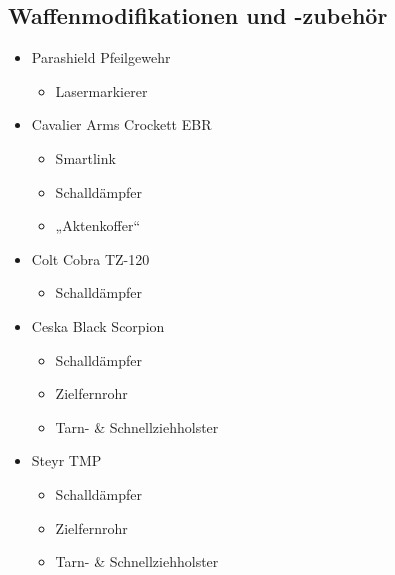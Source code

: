 {\begin{multicols}{2}
\section*{Waffenmodifikationen und -zubehör}
\begin{itemize}
	\item Parashield Pfeilgewehr
		\begin{itemize}
			\item  Lasermarkierer
		\end{itemize}
	\item Cavalier Arms Crockett EBR
		\begin{itemize}
			\item Smartlink
			\item Schalldämpfer
			\item „Aktenkoffer“
		\end{itemize}
	\item Colt Cobra TZ-120
		\begin{itemize}
			\item Schalldämpfer
		\end{itemize}
	\item Ceska Black Scorpion
		\begin{itemize}
			\item Schalldämpfer
			\item Zielfernrohr
			\item Tarn- \& Schnellziehholster
		\end{itemize}
	\item Steyr TMP
		\begin{itemize}
			\item Schalldämpfer
			\item Zielfernrohr
			\item Tarn- \& Schnellziehholster
		\end{itemize}
\end{itemize}



\end{multicols}}
